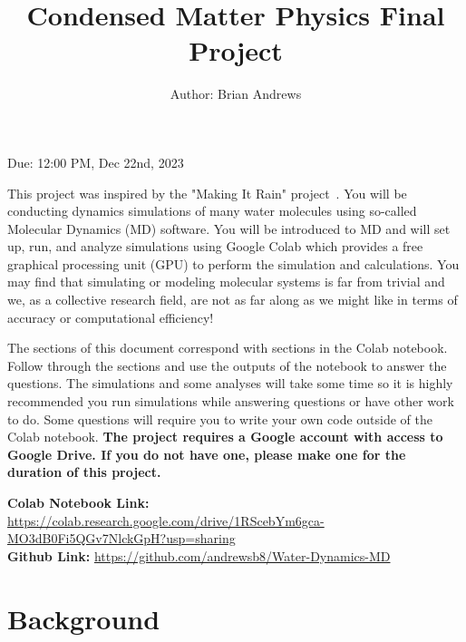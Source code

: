 \documentclass{article}
\title{Condensed Matter Physics Final Project}
\author{Author: Brian Andrews}
\date{}
\begin{document}
\maketitle

\begin{center}
Due: 12:00 PM, Dec 22nd, 2023
\end{center}

This project was inspired by the "Making It Rain" project~\cite{Arantes_JCIM_2021, Arantes_github}. You will be conducting dynamics simulations of many water molecules using so-called Molecular Dynamics (MD) software. You will be introduced to MD and will set up, run, and analyze simulations using Google Colab which provides a free graphical processing unit (GPU) to perform the simulation and calculations. You may find that simulating or modeling molecular systems is far from trivial and we, as a collective research field, are not as far along as we might like in terms of accuracy or computational efficiency!

The sections of this document correspond with sections in the Colab notebook. Follow through the sections and use the outputs of the notebook to answer the questions. The simulations and some analyses will take some time so it is highly recommended you run simulations while answering questions or have other work to do. Some questions will require you to write your own code outside of the Colab notebook. \textbf{The project requires a Google account with access to Google Drive. If you do not have one, please make one for the duration of this project.}

\begin{center}
    \textbf{Colab Notebook Link:} \url{https://colab.research.google.com/drive/1RScebYm6gca-MO3dB0Fi5QGv7NlckGpH?usp=sharing} \\
    \textbf{Github Link:} \url{https://github.com/andrewsb8/Water-Dynamics-MD}
\end{center}

\section*{Background}
\end{document}
